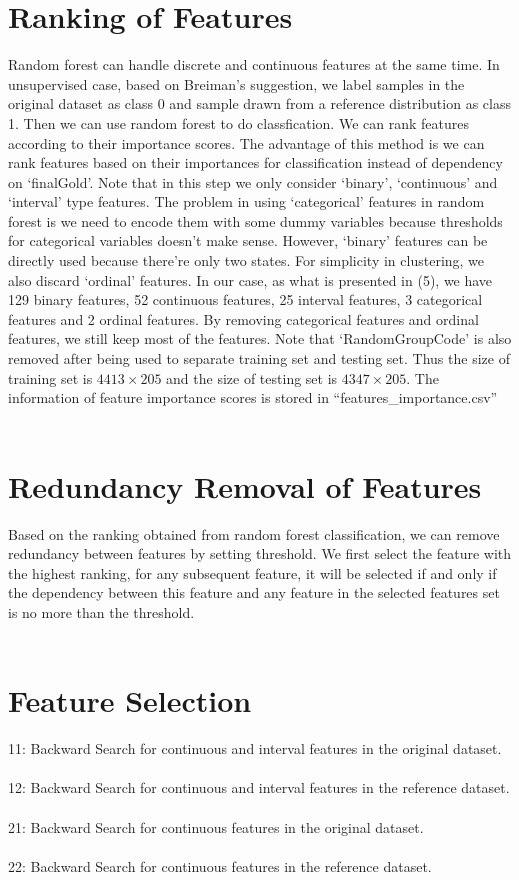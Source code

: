 \documentclass[11pt]{article}
\begin{document}
\section{Ranking of Features}
Random forest can handle discrete and continuous features at the same time. In unsupervised case, based on Breiman's suggestion, we label samples in the original dataset as class 0 and sample drawn from a reference distribution as class 1. Then we can use random forest to do classfication. We can rank features according to their importance scores. The advantage of this method is we can rank features based on their importances for classification instead of dependency on `finalGold'. Note that in this step we only consider `binary', `continuous' and `interval' type features. The problem in using `categorical' features in random forest is we need to encode them with some dummy variables because thresholds for categorical variables doesn't make sense. However, `binary' features can be directly used because there're only two states. For simplicity in clustering, we also discard `ordinal' features. In our case, as what is presented in (5), we have 129 binary features, 52 continuous features, 25 interval features, 3 categorical features and 2 ordinal features. By removing categorical features and ordinal features, we still keep most of the features. Note that `RandomGroupCode' is also removed after being used to separate training set and testing set. Thus the size of training set is $4413\times 205$ and the size of testing set is $4347\times 205$. The information of feature importance scores is stored in ``features\_importance.csv''\\
\\

\section{Redundancy Removal of Features}
Based on the ranking obtained from random forest classification, we can remove redundancy between features by setting threshold. We first select the feature with the highest ranking, for any subsequent feature, it will be selected if and only if the dependency between this feature and any feature in the selected features set is no more than the threshold.\\
\\

\section{Feature Selection}
11: Backward Search for continuous and interval features in the original dataset.\\
\\
12: Backward Search for continuous and interval features in the reference dataset.\\
\\
21: Backward Search for continuous features in the original dataset.\\
\\
22: Backward Search for continuous features in the reference dataset.\\
\\ 
\end{document}
